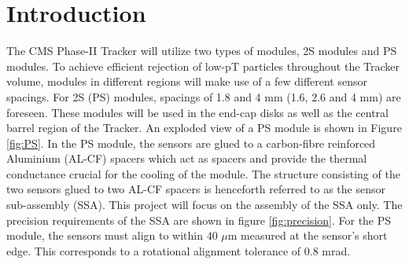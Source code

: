 \documentclass[fleqn,10pt]{SelfArx} %
\affiliation{\textsuperscript{1}\textit{DESY, Hamburg Germany}} %
\affiliation{*\textbf{} james.keaveney@desy.de} %
\begin{document}
\flushbottom %

\maketitle %

\tableofcontents %

\thispagestyle{empty} %


\section*{Introduction} %


The CMS Phase-II Tracker will utilize two types of modules, 2S modules and PS modules. To achieve efficient rejection of low-pT particles throughout the Tracker volume, modules in different regions will make use of a few different sensor spacings. For 2S (PS) modules, spacings of 1.8 and 4 mm (1.6, 2.6 and 4 mm) are foreseen. These modules will be used in the end-cap disks as well as the central barrel region of the Tracker. An exploded view of a PS module is shown in Figure \ref{fig:PS}. In the PS module, the sensors are glued to a carbon-fibre reinforced Aluminium (AL-CF) spacers which act as spacers and provide the thermal conductance crucial for the cooling of the module. The structure consisting of the two sensors glued to two AL-CF spacers is henceforth referred to as the sensor sub-assembly (SSA). This project will focus on the assembly of the SSA only. The precision requirements of the SSA are shown in figure \ref{fig:precision}. For the PS module, the sensors must align to within 40 $\mu$m measured at the sensor's short edge. This corresponds to a rotational alignment tolerance of 0.8 mrad. 
\end{document}
